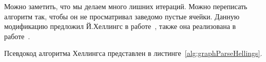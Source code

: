 Можно заметить, что мы делаем много лишних итераций.
Можно переписать алгоритм так, чтобы он не просматривал заведомо пустые ячейки.
Данную модификацию предложил Й.Хеллингс в работе~, также она реализована в работе~.

Псевдокод алгоритма Хеллингса представлен в листинге~\ref{alg:graphParseHellings}.





